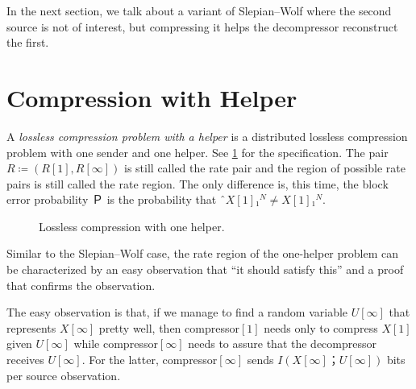 \documentclass[openany]{amsbook}
\numberwithin{equation}{chapter}
\numberwithin{figure}{chapter}
\numberwithin{table}{chapter}
\theoremstyle{definition}	理dfn:Definition~?s			理exa:Example~?s
\theoremstyle{remark}		理cla:Claim~?s				理rem:Remark~?s
\begin{document}
	In the next section, we talk about a variant of Slepian--Wolf
	where the second source is not of interest, but
	compressing it helps the decompressor reconstruct the first.

\section{Compression with Helper}

	A \emph{lossless compression problem with a helper} is
	a distributed lossless compression problem with one sender and one helper.
	See \cref{fig:1helper} for the specification.
	The pair $R≔(R[1],R[∞])$ is still called the rate pair
	and the region of possible rate pairs is still called the rate region.
	The only difference is, this time, the block error probability $Ｐ$ 
	is the probability that $ˆX[1]₁^N≠X[1]₁^N$.
	
	\begin{figure}
		\caption{
			Lossless compression with one helper.
		}\label{fig:1helper}
	\end{figure}
	
	Similar to the Slepian--Wolf case, the rate region of
	the one-helper problem can be characterized by an easy observation that
	“it should satisfy this” and a proof that confirms the observation.
	
	The easy observation is that, if we manage to find a random variable $U[∞]$
	that represents $X[∞]$ pretty well, then compressor$[1]$
	needs only to compress $X[1]$ given $U[∞]$ while compressor$[∞]$
	needs to assure that the decompressor receives $U[∞]$.
	For the latter, compressor$[∞]$ sends $I(X[∞]；U[∞])$ bits per source observation.
	
\end{document}
